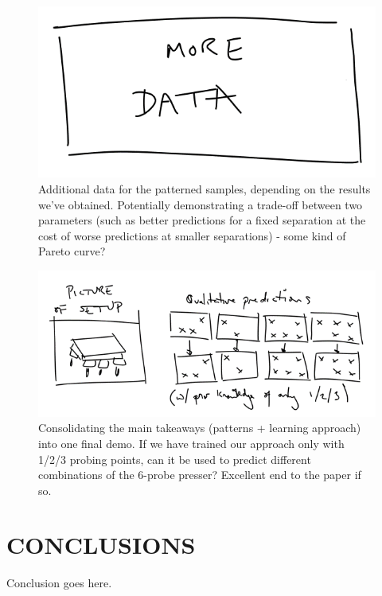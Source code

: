 \begin{figure}[htbp]
  \centering
  \includegraphics[width=0.9\columnwidth]{Images/filler5.png}
  \caption{Additional data for the patterned samples, depending on the results we've obtained. Potentially demonstrating a trade-off between two parameters (such as better predictions for a fixed separation at the cost of worse predictions at smaller separations) - some kind of Pareto curve?}
  \label{fig:patternfollowup}
\end{figure}

\begin{figure}[htbp]
  \centering
  \includegraphics[width=0.9\columnwidth]{Images/filler6.png}
  \caption{Consolidating the main takeaways (patterns + learning approach) into one final demo. If we have trained our approach only with 1/2/3 probing points, can it be used to predict different combinations of the 6-probe presser? Excellent end to the paper if so.}
  \label{fig:finaldemo}
\end{figure}

\section{CONCLUSIONS}
Conclusion goes here.

